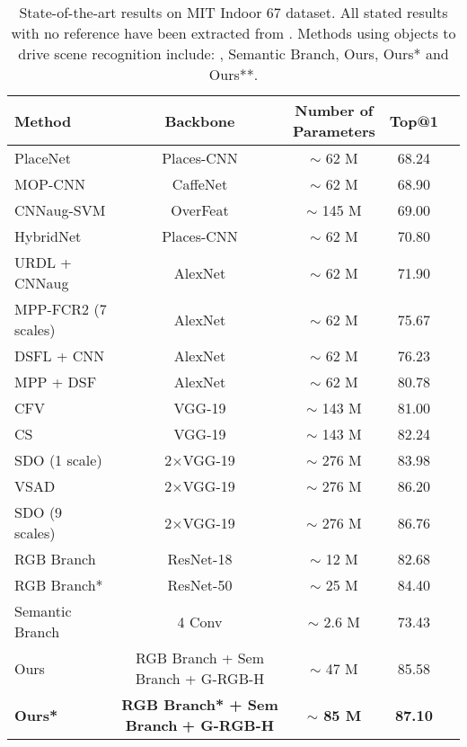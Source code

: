 \documentclass[review, 3p, sort&compress]{elsarticle}
\begin{document}
\begin{table}[t!]
    \begin{centering}
    \renewcommand{\arraystretch}{1.2}
    \footnotesize
    \begin{tabular}{lcccc}
        \hline 
        Method & Backbone & \makecell{Number of \\ Parameters} & Top@1\tabularnewline
        \hline 
        PlaceNet & Places-CNN & $\mathtt{\sim}$ 62 M & 68.24 \tabularnewline
        MOP-CNN & CaffeNet & $\mathtt{\sim}$ 62 M & 68.90\tabularnewline
        CNNaug-SVM & OverFeat & $\mathtt{\sim}$ 145 M & 69.00\tabularnewline
        HybridNet & Places-CNN & $\mathtt{\sim}$ 62 M & 70.80\tabularnewline
        URDL + CNNaug & AlexNet & $\mathtt{\sim}$ 62 M & 71.90\tabularnewline
        MPP-FCR2 (7 scales) & AlexNet & $\mathtt{\sim}$ 62 M & 75.67\tabularnewline
        DSFL + CNN & AlexNet & $\mathtt{\sim}$ 62 M & 76.23\tabularnewline
        MPP + DSF  & AlexNet & $\mathtt{\sim}$ 62 M & 80.78\tabularnewline
        CFV & VGG-19 & $\mathtt{\sim}$ 143 M & 81.00\tabularnewline
        CS & VGG-19 & $\mathtt{\sim}$ 143 M & 82.24\tabularnewline
        SDO (1 scale) \cite{cheng2018scene} & 2\(\times\)VGG-19 & $\mathtt{\sim}$ 276 M & 83.98\tabularnewline
        VSAD \cite{wang2017weakly} & 2\(\times\)VGG-19 & $\mathtt{\sim}$ 276 M & 86.20\tabularnewline
        SDO (9 scales) \cite{cheng2018scene} & 2\(\times\)VGG-19 & $\mathtt{\sim}$ 276 M & 86.76\tabularnewline
        \hline
        RGB Branch & ResNet-18 & $\mathtt{\sim}$ 12 M & 82.68\tabularnewline
        RGB Branch* & ResNet-50 & $\mathtt{\sim}$ 25 M & 84.40\tabularnewline
        Semantic Branch & 4 Conv & $\mathtt{\sim}$ 2.6 M & 73.43\tabularnewline
        Ours & RGB Branch + Sem Branch + G-RGB-H & $\mathtt{\sim}$ 47 M & 85.58\tabularnewline
        \textbf{Ours*} & \textbf{RGB Branch* + Sem Branch} \textbf{+ G-RGB-H} & \textbf{$\mathtt{\sim}$ 85 M} & \textbf{87.10}\tabularnewline
        \hline 
    \end{tabular}
    \caption{State-of-the-art results on MIT Indoor 67 dataset. All stated results with no reference have been extracted from \cite{cheng2018scene}. Methods using objects to drive scene recognition include: \cite{jiang2019deep, cheng2018scene, wang2017weakly}, Semantic Branch, Ours, Ours* and Ours**.}
    \label{tab:MIT Indoor 67 Results}
    \par\end{centering}
\end{table}
\end{document}
